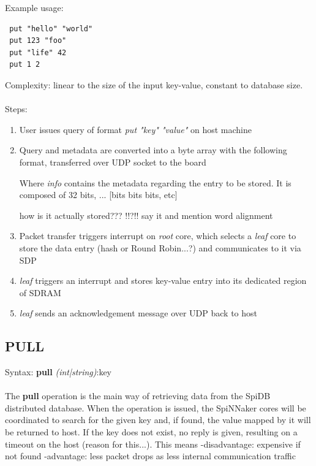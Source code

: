 \noindent
 Example usage:\\
 \begin{lstlisting}
 put "hello" "world"
 put 123 "foo"
 put "life" 42
 put 1 2
 \end{lstlisting}
\noindent 
 Complexity: linear to the size of the input key-value, constant to database size.\\\\
 
Steps:
\begin{enumerate}
\item User issues query of format \textit{put "key" "value"} on host machine
\item Query and metadata are converted into a byte array with the following format, transferred over UDP socket to the board



Where \textit{info} contains the metadata regarding the entry to be stored. It is composed of 32 bits, ...
[bits bits bits, etc]

how is it actually stored??? !!?!! say it and mention word alignment

\item Packet transfer triggers interrupt on \textit{root} core, which selects a \textit{leaf} core to store the data entry (hash or Round Robin...?) and communicates to it via SDP
\item \textit{leaf} triggers an interrupt and stores key-value entry into its dedicated region of SDRAM
\item \textit{leaf} sends an acknowledgement message over UDP back to host
\end{enumerate}

\subsection{PULL}

 Syntax:
 \noindent
 {\large\textbf{pull} \textit{(int|string)}:key}\\\\
 
The \textbf{pull} operation is the main way of retrieving data from the SpiDB distributed database.
When the operation is issued, the SpiNNaker cores will be coordinated to search for the given key and, if found, the value mapped by it will be returned to host. If the key does not exist, no reply is given, resulting on a timeout on the host (reason for this...). This means 
-disadvantage: expensive if not found
-advantage: less packet drops as less internal communication traffic
 
